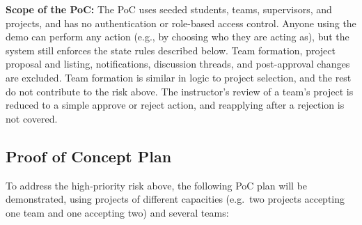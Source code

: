 \documentclass{article}
\begin{document}
\textbf{Scope of the PoC:} The PoC uses seeded students, teams, supervisors, and
projects, and has no authentication or role-based access control. Anyone using
the demo can perform any action (e.g., by choosing who they are acting as), but
the system still enforces the state rules described below. Team formation,
project proposal and listing, notifications, discussion threads, and
post-approval changes are excluded. Team formation is similar in logic to
project selection, and the rest do not contribute to the risk above. The
instructor's review of a team's project is reduced to a simple approve or
reject action, and reapplying after a rejection is not covered.

\subsection{Proof of Concept Plan}

To address the high-priority risk above, the following PoC plan will be
demonstrated, using projects of different capacities (e.g.\ two projects
accepting one team and one accepting two) and several teams:
\end{document}
